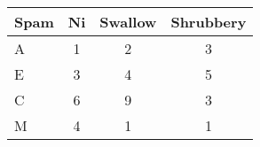 \begin{tabular}{lccc}
	\toprule
    \textbf{Spam} & \textbf{Ni} & \textbf{Swallow} & \textbf{Shrubbery} \\
    \midrule
    A & 1 & 2 & 3 \\
    \midrule
    E & 3 & 4 & 5 \\
    C & 6 & 9 & 3 \\
    \midrule
    M & 4 & 1 & 1 \\
    \bottomrule
\end{tabular}